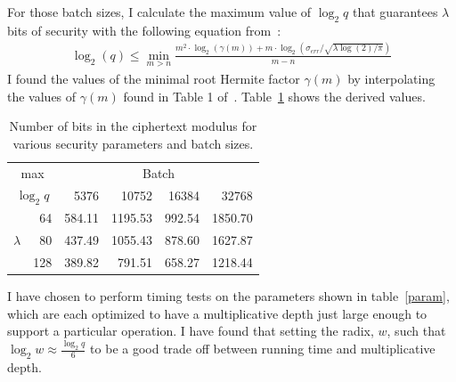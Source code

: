 \documentclass{article}
\begin{document}
        For those batch sizes, 
        I calculate the maximum value of $\log_2{q}$ that guarantees
        $\lambda$ bits of security with the following equation from~\cite{comparison}:
        \begin{align}
            \log_2(q) 
            \leq \min_{m> n}
            \frac{
                m^2\cdot\log_2(\gamma(m)) 
                + m\cdot
                \log_2\left(
                    \sigma_{err}
                    /
                    \sqrt{\lambda\log(2)/\pi}
                \right)
            }{
                m - n
            }
        \end{align}
        I found the values of the minimal root Hermite factor $\gamma(m)$ by interpolating the values of
        $\gamma(m)$ found in Table 1 of~\cite{comparison}.
        Table~\ref{tab3} shows the derived values.

        \begin{table}[h]
        \begin{center}
            \begin{tabular}{| r | r || r | r | r | r |}
                \cline{3-6}
                \multicolumn{2}{c||}{max}
                & \multicolumn{4}{|c|}{Batch}
                \\ 
                \cline{3-6}
                \cline{3-6}
                \multicolumn{2}{c||}{$\log_2q$}
                     & 5376  & 10752 & 16384 & 32768 
                \\ \hline\hline
                \multirow{3}{*}{$\lambda$} & 64  & 584.11 & 1195.53 & 992.54 & 1850.70
                \\ \cline{2-6}
                & 80   & 437.49 & 1055.43 & 878.60 & 1627.87
                \\ \cline{2-6}
                & 128  & 389.82 &  791.51 & 658.27 & 1218.44
                \\ \hline
            \end{tabular}
        \end{center}
        \caption{Number of bits in the ciphertext modulus for various security parameters and batch sizes.}
        \label{tab3}
        \end{table}

        I have chosen to perform timing tests on the parameters shown in table~\ref{param},
        which are each optimized to have a
        multiplicative depth just large enough to support a particular operation.
        I have found that setting the radix, $w$, such that
        $\log_2 w \approx \frac{\log_2 q}{6}$ to be a good trade off
        between running time and multiplicative depth.
\end{document}

